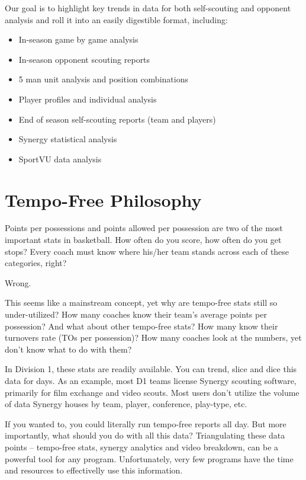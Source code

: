 \documentclass[letterpaper,10pt,english]{sphinxmanual}
\begin{document}
Our goal is to highlight key trends in data for both self-scouting and opponent
analysis and roll it into an easily digestible format, including:
\begin{itemize}
\item {} 
In-season game by game analysis

\item {} 
In-season opponent scouting reports

\item {} 
5 man unit analysis and position combinations

\item {} 
Player profiles and individual analysis

\item {} 
End of season self-scouting reports (team and players)

\item {} 
Synergy statistical analysis

\item {} 
SportVU data analysis

\end{itemize}


\section{Tempo-Free Philosophy}
\label{_static/basic:tempo-free-philosophy}
Points per possessions and points allowed per possession are two of the most
important stats in basketball. How often do you score, how often do you get
stops? Every coach must know where his/her team stands across each of these
categories, right?

Wrong.

This seems like a mainstream concept, yet why are tempo-free stats still so
under-utilized? How many coaches know their team’s average points per possession?
And what about other tempo-free stats? How many know their turnovers rate (TOs
per possession)? How many coaches look at the numbers, yet don’t know what to
do with them?

In Division 1, these stats are readily available. You can trend, slice and
dice this data for days. As an example, most D1 teams license Synergy scouting
software, primarily for film exchange and video scouts. Most users don’t utilize
the volume of data Synergy houses by team, player, conference, play-type, etc.

If you wanted to, you could literally run tempo-free reports all day. But more
importantly, what should you do with all this data? Triangulating these data
points – tempo-free stats, synergy analytics and video breakdown, can be a
powerful tool for any program. Unfortunately, very few programs have the time
and resources to effectivelly use this information.
\end{document}
